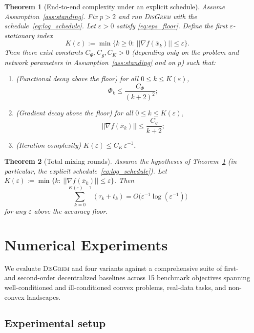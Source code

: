 \documentclass[11pt,a4paper]{article}
\def\cO{O}%
\def\norm#1{||#1||}%
\newtheorem{theorem}{Theorem}[section]
\newcommand{\norm}[1]{\left\|#1\right\|}
\newcommand{\cO}{\mathcal{O}}
\begin{document}
	\begin{theorem}[End-to-end complexity under an explicit schedule]\label{thm:end2end}
		Assume Assumption~\ref{ass:standing}. Fix $p>2$ and run \textsc{DisGrem} with the schedule~\eqref{eq:log_schedule}.
		Let $\varepsilon>0$ satisfy \eqref{eq:eps_floor}.
		Define the first $\varepsilon$-stationary index
		\[
		K(\varepsilon):=\min\{k\ge 0:\ \norm{\nabla f(\bar x_k)}\le \varepsilon\}.
		\]
		Then there exist constants $C_\Phi,C_g,C_K>0$ (depending only on the problem and network parameters in Assumption~\ref{ass:standing} and on $p$) such that:
		\begin{enumerate}[leftmargin=1.2em,itemsep=2pt]
			\item (Functional decay above the floor) for all $0\le k\le K(\varepsilon)$,
			\[
			\Phi_k\le \frac{C_\Phi}{(k+2)^2};
			\]
			\item (Gradient decay above the floor) for all $0\le k\le K(\varepsilon)$,
			\[
			\norm{\nabla f(\bar x_k)}\le \frac{C_g}{k+2};
			\]
			\item (Iteration complexity) $K(\varepsilon)\le C_K\,\varepsilon^{-1}$.
		\end{enumerate}
	\end{theorem}
	\begin{theorem}[Total mixing rounds] \label{thm:comm}
		Assume the hypotheses of Theorem~\ref{thm:end2end} (in particular, the explicit schedule~\eqref{eq:log_schedule}).
		Let $K(\varepsilon):=\min\{k:\ \norm{\nabla f(\bar x_k)}\le \varepsilon\}$. Then
		\[
		\sum_{k=0}^{K(\varepsilon)-1}(\tau_k+t_k)
		=\cO\bigl(\varepsilon^{-1}\log(\varepsilon^{-1})\bigr)
		\]
		for any $\varepsilon$ above the accuracy floor.
	\end{theorem}
	
	
	\section{Numerical Experiments}\label{sec:experiments}
	
	We evaluate \textsc{DisGrem} and four variants against a comprehensive suite of first- and
	second-order decentralized baselines across 15 benchmark objectives spanning
	well-conditioned and ill-conditioned convex problems, real-data tasks, and non-convex landscapes.
	
	\subsection{Experimental setup}\label{ssec:setup}
	
\end{document}

